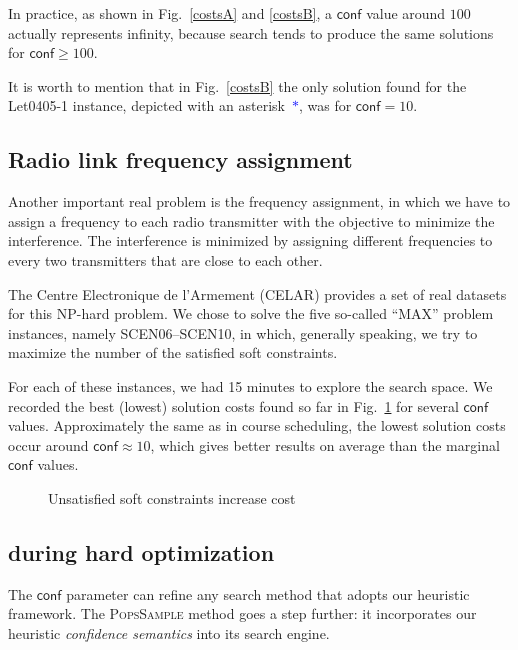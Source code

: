 \documentclass{ws-ijait}
\begin{document}
In practice, as shown in Fig.\ \ref{costsA} and \ref{costsB}, a $\mathsf{conf}$ value around $100$ actually represents infinity, because search tends to produce the same solutions for $\mathsf{conf} \geq 100$.

It is worth to mention that in Fig.~\ref{costsB} the only solution found for the \textsf{Let0405-1} instance, depicted with an asterisk~\textcolor{blue}{$*$}, was for $\mathsf{conf} = 10$.

\subsection{Radio link frequency assignment}

Another important real problem is the frequency assignment, in which we have to assign a frequency to each radio transmitter with the objective to minimize the interference. The interference is minimized by assigning different frequencies to every two transmitters that are close to each other.

The Centre Electronique de l'Armement (CELAR) provides a set of real datasets for this NP-hard problem.\cite{radio-link} We chose to solve the five so-called ``MAX'' problem instances, namely \textsf{SCEN06}--\textsf{SCEN10}, in which, generally speaking, we try to maximize the number of the satisfied soft constraints.

For each of these instances, we had 15 minutes to explore the search space. We recorded the best (lowest) solution costs found so far in Fig.~\ref{CELAR} for several $\mathsf{conf}$ values. Approximately the same as in course scheduling, the lowest solution costs occur around $\mathsf{conf} \approx 10$, which gives better results on average than the marginal $\mathsf{conf}$ values.

\begin{figure}
\centering

\caption{Unsatisfied soft constraints increase cost\label{CELAR}}
\end{figure}

\subsection{\PopsSample{} during hard optimization\label{PoPS}}

The $\mathsf{conf}$ parameter can refine any search method that adopts our heuristic framework. The \textsc{PopsSample} method goes a step further: it incorporates our heuristic \emph{confidence semantics} into its search engine.
\end{document}
